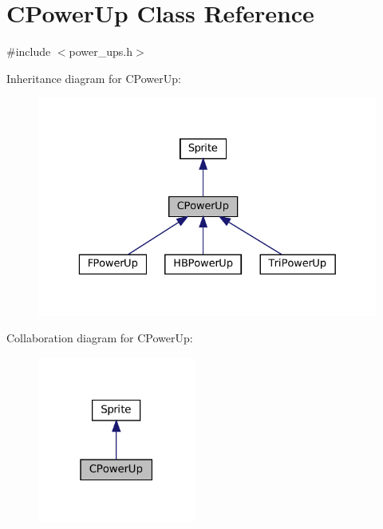 \hypertarget{classCPowerUp}{}\section{C\+Power\+Up Class Reference}
\label{classCPowerUp}


{\ttfamily \#include $<$power\+\_\+ups.\+h$>$}



Inheritance diagram for C\+Power\+Up\+:\nopagebreak
\begin{figure}[H]
\begin{center}
\leavevmode
\includegraphics[width=329pt]{classCPowerUp__inherit__graph}
\end{center}
\end{figure}


Collaboration diagram for C\+Power\+Up\+:\nopagebreak
\begin{figure}[H]
\begin{center}
\leavevmode
\includegraphics[width=147pt]{classCPowerUp__coll__graph}
\end{center}
\end{figure}
